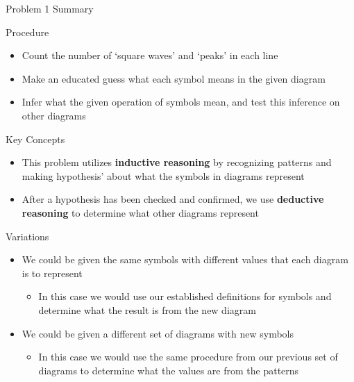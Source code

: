 
\begin{summary}{Problem 1 Summary}
    \begin{statement}{Procedure}
        \begin{itemize}
            \item Count the number of `square waves' and `peaks' in each line
            \item Make an educated guess what each symbol means in the given diagram
            \item Infer what the given operation of symbols mean, and test this inference on other diagrams
        \end{itemize}
    \end{statement}
    \begin{statement}{Key Concepts}
        \begin{itemize}
            \item This problem utilizes \textbf{inductive reasoning} by recognizing patterns and making hypothesis' about what the symbols in diagrams represent
            \item After a hypothesis has been checked and confirmed, we use \textbf{deductive reasoning} to determine what other diagrams represent
        \end{itemize}
    \end{statement}
    \begin{statement}{Variations}
        \begin{itemize}
            \item We could be given the same symbols with different values that each diagram is to represent
            \begin{itemize}
                \item In this case we would use our established definitions for symbols and determine what the result is from the new diagram
            \end{itemize}
            \item We could be given a different set of diagrams with new symbols
            \begin{itemize}
                \item In this case we would use the same procedure from our previous set of diagrams to determine what the values are from the patterns
            \end{itemize}
        \end{itemize}
    \end{statement}
\end{summary}

